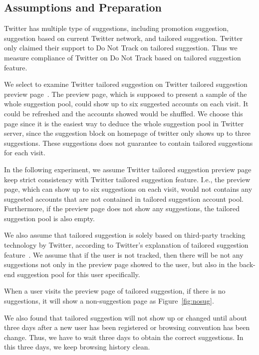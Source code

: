 \documentclass{sig-alternate}
\begin{document}
\subsection{Assumptions and Preparation} \label{sec:pre}

Twitter has multiple type of suggestions, including promotion suggestion, suggestion based on current Twitter network, and tailored suggestion. Twitter only claimed their support to Do Not Track on tailored suggestion. Thus we measure compliance of Twitter on Do Not Track based on tailored suggestion feature.

We select to examine Twitter tailored suggestion on Twitter tailored suggestion preview page~\cite{twittertailoredpreview}. The preview page, which is supposed to present a sample of the whole suggestion pool, could show up to six suggested accounts on each visit. It could be refreshed and the accounts showed would be shuffled. We choose this page since it is the easiest way to deduce the whole suggestion pool in Twitter server, since the suggestion block on homepage of twitter only shows up to three suggestions. These suggestions does not guarantee to contain tailored suggestions for each visit.

In the following experiment, we assume Twitter tailored suggestion preview page~\cite{twittertailoredpreview} keep strict consistency with Twitter tailored suggestion feature. I.e., the preview page, which can show up to six suggestions on each visit, would not contains any suggested accounts that are not contained in tailored suggestion account pool. Furthermore, if the preview page does not show any suggestions, the tailored suggestion pool is also empty.

We also assume that tailored suggestion is solely based on third-party tracking technology by Twitter, according to Twitter's explanation of tailored suggestion feature~\cite{twitterts}. We assume that if the user is not tracked, then there will be not any suggestions not only in the preview page showed to the user, but also in the back-end suggestion pool for this user specifically. 

When a user visits the preview page of tailored suggestion, if there is no suggestions, it will show a non-suggestion page as Figure~\ref{fig:nosug}.

We also found that tailored suggestion will not show up or changed until about three days after a new user has been registered or browsing convention has been change. Thus, we have to wait three days to obtain the correct suggestions. In this three days, we keep browsing history clean.
\end{document}
